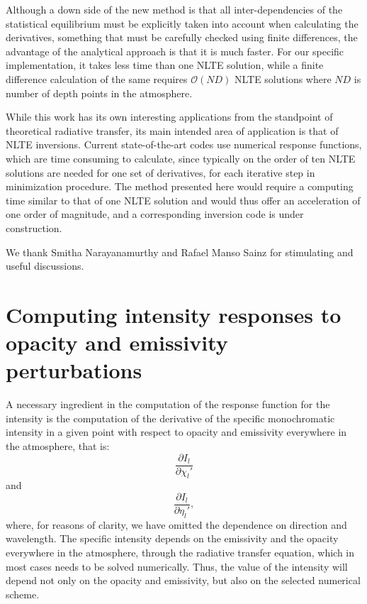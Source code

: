 \documentclass[referee]{aa}
\begin{document}
Although a down side of the new method is that all inter-dependencies of the statistical equilibrium must be explicitly taken into account when calculating the derivatives, something that must be carefully checked using finite differences, the advantage of the analytical approach is that it is much faster. For our specific implementation, it takes less time than one NLTE solution, while a finite difference calculation of the same requires ${\mathcal O}(ND)$ NLTE solutions where $ND$ is number of depth points in the atmosphere. 

While this work has its own interesting applications from the standpoint of theoretical radiative transfer, its main intended area of application is that of NLTE inversions. Current state-of-the-art codes use numerical response functions, which are time consuming to calculate, since typically on the order of ten NLTE solutions are needed for one set of derivatives, for each iterative step in minimization procedure. The method presented here would require a computing time similar to that of one NLTE solution and would thus offer an acceleration of one order of magnitude, and a corresponding inversion code is under construction.


\begin{acknowledgements}
 We thank Smitha Narayanamurthy and Rafael Manso Sainz for stimulating and useful discussions. 
\end{acknowledgements}

\appendix
\section{Computing intensity responses to opacity and emissivity perturbations}
\label{Appendix_A}

A necessary ingredient in the computation of the response function for the intensity is the computation of the derivative of the specific monochromatic intensity in a given point with respect to opacity and emissivity everywhere in the atmosphere, that is:
$$\frac{\partial I_l}{\partial \chi_l'}$$ 
and 
$$\frac{\partial I_l}{\partial \eta_l'},$$ 
where, for reasons of clarity, we have omitted the dependence on direction and wavelength. The specific intensity depends on the emissivity and the opacity everywhere in the atmosphere, through the radiative transfer equation, which in most cases needs to be solved numerically. Thus, the value of the intensity will depend not only on the opacity and emissivity, but also on the selected numerical scheme. 
\end{document}
